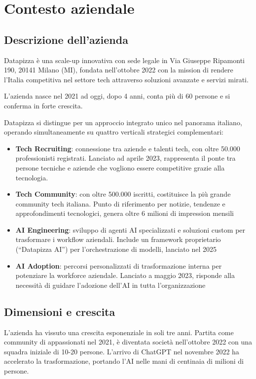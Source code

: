 \chapter{Contesto aziendale}
\sloppypar
\section{Descrizione dell'azienda}
Datapizza è una scale-up innovativa con sede legale in Via Giuseppe Ripamonti 190, 20141 Milano (MI), fondata nell'ottobre 2022 con la mission di rendere l'Italia competitiva nel settore tech attraverso soluzioni avanzate e servizi mirati.

L'azienda nasce nel 2021 ad oggi, dopo 4 anni, conta più di 60 persone e si conferma in forte crescita.

Datapizza si distingue per un approccio integrato unico nel panorama italiano, operando simultaneamente su quattro verticali strategici complementari:

\begin{itemize}
  \item \textbf{Tech Recruiting}: connessione tra aziende e talenti tech, con oltre 50.000 professionisti registrati. Lanciato ad aprile 2023, rappresenta il ponte tra persone tecniche e aziende che vogliono essere competitive grazie alla tecnologia.
  
  \item \textbf{Tech Community}: con oltre 500.000 iscritti, costituisce la più grande community tech italiana. Punto di riferimento per notizie, tendenze e approfondimenti tecnologici, genera oltre 6 milioni di impression mensili
  
  \item \textbf{AI Engineering}: sviluppo di agenti AI specializzati e soluzioni custom per trasformare i workflow aziendali. Include un framework proprietario (``Datapizza AI'') per l'orchestrazione di modelli, lanciato nel 2025
  
  \item \textbf{AI Adoption}: percorsi personalizzati di trasformazione interna per potenziare la workforce aziendale. Lanciato a maggio 2023, risponde alla necessità di guidare l'adozione dell'AI in tutta l'organizzazione
\end{itemize}

\section{Dimensioni e crescita}
L'azienda ha vissuto una crescita esponenziale in soli tre anni. Partita come community di appassionati nel 2021, è diventata società nell'ottobre 2022 con una squadra iniziale di 10-20 persone. L'arrivo di ChatGPT nel novembre 2022 ha accelerato la trasformazione, portando l'AI nelle mani di centinaia di milioni di persone.

